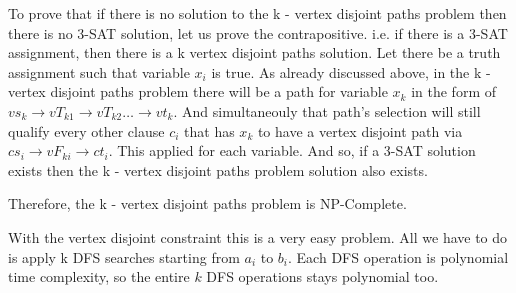 \documentclass{imports}
\begin{document}
    To prove that if there is no solution to the k - vertex disjoint paths problem then there is no 3-SAT solution, let us prove the 
    contrapositive. i.e. if there is a 3-SAT assignment, then there is a k vertex disjoint paths solution. Let there be a truth assignment
    such that variable $x_i$ is true. As already discussed above, in the k - vertex disjoint paths problem there will be a path for 
    variable $x_k$ in the form of $vs_k \to vT_{k1} \to  vT_{k2} \dots \to vt_k$. And simultaneouly that path's selection will still qualify
    every other clause $c_i$ that has $x_k$ to have a vertex disjoint path via $cs_i \to vF_{ki} \to ct_i$. This applied for each 
    variable. And so, if a 3-SAT solution exists then the k - vertex disjoint paths problem solution also exists. \vspace{10pt}

    Therefore, the k - vertex disjoint paths problem is NP-Complete. \vspace{10pt}

    With the vertex disjoint constraint this is a very easy problem. All we have to do is apply k DFS searches starting from $a_i$
    to $b_i$. Each DFS operation is polynomial time complexity, so the entire $k$ DFS operations stays polynomial too.





    \vspace{10pt}
    \cite{team}
    \newpage
    
    
\end{document}
